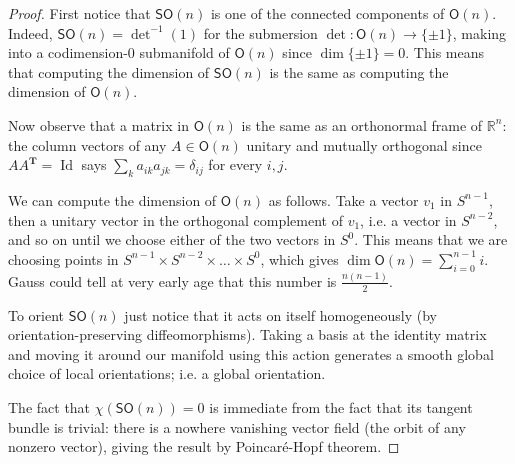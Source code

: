 \begin{proof}\leavevmode
	First notice that \(\mathsf{SO}(n)\) is one of the connected components of \(\mathsf{O}(n)\). Indeed, \(\mathsf{SO}(n)=\det^{-1}(1)\) for the submersion \(\det:\mathsf{O}(n)\to \{\pm 1\}\), making into a codimension-0 submanifold of  \(\mathsf{O}(n)\) since \(\dim \{\pm 1\}=0\). This means that computing the dimension of \(\mathsf{SO}(n)\) is the same as computing the dimension of \(\mathsf{O}(n)\).

	Now observe that a matrix in \(\mathsf{O}(n)\) is the same as an orthonormal frame of \(\mathbb{R}^n\): the column vectors of any  \(A \in \mathsf{O}(n)\) unitary and mutually orthogonal since \(A A ^{\mathbf{T}}=\operatorname{Id}\) says \(\sum_{k}a_{ik}a_{jk}=\delta_{ij}\) for every \(i,j\). 

	We can compute the dimension of \(\mathsf{O}(n)\) as follows. Take a vector \(v_1\) in \(S^{n-1}\), then a unitary vector in the orthogonal complement of  \(v_1\), i.e. a vector in \(S^{n-2}\), and so on until we choose either of the two vectors in \(S^0\). This means that we are choosing points in \(S^{n-1}\times S^{n-2} \times \ldots \times S^0\), which gives \(\dim \mathsf{O}(n)=\sum_{i=0}^{n-1}i\). Gauss could tell at very early age that this number is \(\frac{n(n-1)}{2}\).

	To orient \(\mathsf{SO}(n)\) just notice that it acts on itself homogeneously (by orientation-preserving diffeomorphisms). Taking a basis at the identity matrix and moving it around our manifold using this action generates a smooth global choice of local orientations; i.e. a global orientation.

	The fact that \(\chi(\mathsf{SO}(n))=0\) is immediate from the fact that its tangent bundle is trivial: there is a nowhere vanishing vector field (the orbit of any nonzero vector), giving the result by Poincaré-Hopf theorem.
\iffalse
	\(\mathsf{SL}(n)\) is \(\det^{-1}(1)\) for \(\det:\mathsf{GL}(n)\to \mathbb{R}\). And \(\mathsf{O}(n)\) is \(F^{-1}(\operatorname{Id})\) for \(F: \mathsf{GL}(n)\to \mathsf{GL}(n)\), \(A \mapsto  A A^{\mathbf{T}}\). And then \(\mathsf{SO}(n)=\mathsf{SL}(n)\cap \mathsf{O}(n)\).

To compute the dimension of \(\mathsf{SO}(n)\) consider the embedding \(\mathsf{O}(n)\hookrightarrow \mathsf{GL}(n)\). If \(\mathsf{O}(n)\pitchfork \mathsf{SL}(n)\) we get that \(\mathsf{SO}(n)\) has the same codimension inside \(\mathsf{O}(n)\) as the codimension of \(\mathsf{SL}(n)\) inside \(\mathsf{GL}(n)\), the latter being 1 since it is a level-set of a real valued function. {\color{2}But what is the dimension of \(\mathsf{O}(n)\)?}

To give \(\mathsf{SO}(n)\) an orientation we can use the preimage orientation. That is\fi
\end{proof}

